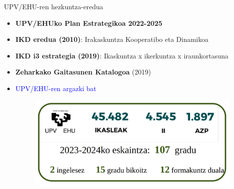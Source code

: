 \documentclass[
 10pt,%
 compress,%
 t,       %
 xcolor=svgnames
]{beamer}
\theoremstyle{definition} \newtheorem{definicion}{Definicion}[section]
\theoremstyle{propiedades} \newtheorem{propiedades}{Propiedades}[section]
\begin{document}
\begin{frame}{UPV/EHU-ren hezkuntza-eredua} 

\medskip
\small

\begin{itemize}
	
\item \textbf{UPV/EHUko Plan Estrategikoa 2022-2025}

\medskip

\item \textbf{IKD eredua (2010)}: Irakaskuntza Kooperatibo eta Dinamikoa


%

\medskip
\item \textbf{IKD i3 estrategia (2019)}: Ikaskuntza x ikerkuntza x iraunkortasuna


\medskip

\item \textbf{Zeharkako Gaitasunen Katalogoa} (2019)


\bigskip

\item \textcolor{blue}{UPV/EHU-ren argazki bat}

\medskip
\begin{figure}
\centering
%
\begin{minipage}{.8\textwidth}
	\colorbox{white}  {\includegraphics[width=0.8\linewidth]{EHU_Datuetan}}
\end{minipage}
%
\end{figure}



\end{itemize}
\end{frame}
\end{document}
